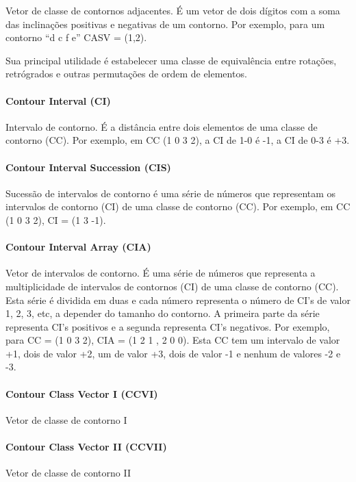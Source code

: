 \documentclass{article}
\begin{document}
Vetor de classe de contornos adjacentes. É um vetor de dois dígitos
com a soma das inclinações positivas e negativas de um contorno. Por
exemplo, para um contorno ``d c f e'' CASV = (1,2).

Sua principal utilidade é estabelecer uma classe de equivalência entre
rotações, retrógrados e outras permutações de ordem de elementos.

\paragraph{Contour Interval (CI)}
\label{sec:contour-interval-ci}

Intervalo de contorno. É a distância entre dois elementos de uma
classe de contorno (CC). Por exemplo, em CC (1 0 3 2), a CI de 1-0 é
-1, a CI de 0-3 é +3.

\paragraph{Contour Interval Succession (CIS)}
\label{sec:cont-interv-succ}

Sucessão de intervalos de contorno é uma série de números que
representam os intervalos de contorno (CI) de uma classe de contorno
(CC). Por exemplo, em CC (1 0 3 2), CI = (1 3 -1).

\paragraph{Contour Interval Array (CIA)}
\label{sec:cont-interv-array}

Vetor de intervalos de contorno. É uma série de números que representa
a multiplicidade de intervalos de contornos (CI) de uma classe de
contorno (CC). Esta série é dividida em duas e cada número representa
o número de CI's de valor 1, 2, 3, etc, a depender do tamanho do
contorno. A primeira parte da série representa CI's positivos e a
segunda representa CI's negativos. Por exemplo, para CC = (1 0 3 2),
CIA = (1 2 1 , 2 0 0). Esta CC tem um intervalo de valor +1, dois de
valor +2, um de valor +3, dois de valor -1 e nenhum de valores -2 e
-3.

\paragraph{Contour Class Vector I (CCVI)}
\label{sec:contour-class-vector-1}

Vetor de classe de contorno I

\paragraph{Contour Class Vector II (CCVII)}
\label{sec:contour-class-vector-2}

Vetor de classe de contorno II



\end{document}
